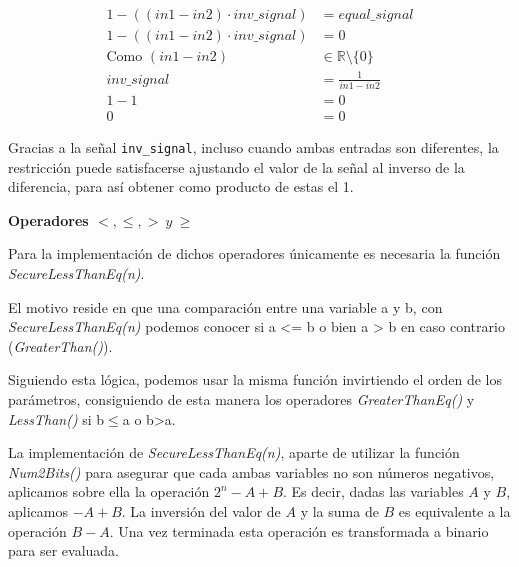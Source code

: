 \documentclass[a4paper,12pt]{report}
\begin{document}
	\begin{equation}
		\begin{aligned}
			1 - ((in1 - in2) \cdot inv\_signal) &= equal\_signal \\
			1 - ((in1 - in2) \cdot inv\_signal) &= 0 \\
			\text{Como } (in1 - in2) &\in \mathbb{R} \setminus \{0\} \\
			inv\_signal &= \frac{1}{in1 - in2} \\
			1 - 1 &= 0 \\
			0 &= 0
		\end{aligned}
	\end{equation}
	
	\vspace{0.2cm}
	\noindent Gracias a la señal \texttt{inv\_signal}, incluso cuando ambas entradas son diferentes, la restricción puede satisfacerse ajustando el valor de la señal al inverso de la diferencia, para así obtener como producto de estas el 1.
	
	\vspace{0.6cm}
	\noindent \textbf{Operadores $<, \leq, > \ y \ \geq$}
	\vspace{0.2cm}
	
	\label{sssec:less-greater}
	
	\noindent Para la implementación de dichos operadores únicamente es necesaria la función \textit{SecureLessThanEq(n)}.
	
	\vspace{0.2cm}
	
	\noindent El motivo reside en que una comparación entre una variable a y b, con \textit{SecureLessThanEq(n)} podemos conocer si a <= b o bien a > b en caso contrario (\textit{GreaterThan()}). 
	
	\vspace{0.2cm}
	
	\noindent Siguiendo esta lógica, podemos usar la misma función invirtiendo el orden de los parámetros, consiguiendo de esta manera los operadores \textit{GreaterThanEq()} y \textit{LessThan()}  si b$\leq$a o b>a.
	
	\vspace{0.2cm}
	
	\noindent La implementación de \textit{SecureLessThanEq(n)}, aparte de utilizar la función \textit{Num2Bits()} para asegurar que cada ambas variables no son números negativos, aplicamos sobre ella la operación $2^n - A + B$. Es decir, dadas las variables $A$ y $B$, aplicamos $-A + B$. La inversión del valor de $A$ y la suma de $B$ es equivalente a la operación $B-A$. Una vez terminada esta operación es transformada a binario para ser evaluada.
	
\end{document}
